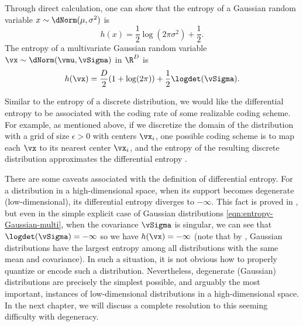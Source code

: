 \documentclass[../../book-main.tex]{subfiles}
\begin{document}
\begin{example}
    Through direct calculation, one can show that the entropy of a
    Gaussian random variable \(x \sim \dNorm(\mu, \sigma^{2})\) is
    \begin{equation}
        h(x) = \frac{1}{2}\log(2\pi\sigma^{2}) + \frac{1}{2}.
        \label{eqn:entropy-Gaussian}
    \end{equation}
    The entropy of a multivariate Gaussian random variable \(\vx \sim
    \dNorm(\vmu, \vSigma)\) in \(\R^{D}\) is
    \begin{equation}
        h(\vx) = \frac{D}{2}(1 + \log(2\pi)) +
        \frac{1}{2}\logdet(\vSigma).
        \label{eqn:entropy-Gaussian-multi}
    \end{equation}
\end{example}

Similar to the entropy of a discrete distribution, we would like the
differential entropy to be associated with the coding rate of some
realizable coding scheme. For example, as mentioned above, if we
discretize the domain of the distribution with a grid of size
\(\epsilon > 0\) with centers \(\vx_{i}\), one possible coding scheme
is to map each \(\vx\) to its nearest center \(\vx_{i}\), and
the entropy of the resulting discrete distribution approximates the
differential entropy \cite{Cover-Thomas}.

There are some caveats associated with the definition
of differential entropy. For a distribution in a high-dimensional
space, when its support becomes degenerate (low-dimensional), its
differential entropy diverges to \(-\infty\). This fact is proved in
, but even in the simple explicit case of
Gaussian distributions \eqref{eqn:entropy-Gaussian-multi}, when the
covariance \(\vSigma\) is singular, we can see that
\(\logdet(\vSigma) = -\infty\) so we have \(h(\vx) = -\infty\) (note
    that by , Gaussian distributions have the
largest entropy among all distributions with the same mean and covariance). In
such a situation, it is not obvious how to properly quantize or
encode such a distribution. Nevertheless, degenerate (Gaussian)
distributions are precisely the simplest possible, and arguably the
most important, instances of low-dimensional distributions in a
high-dimensional space. In the next chapter, we will discuss a complete
resolution to this seeming difficulty with degeneracy.
\end{document}
